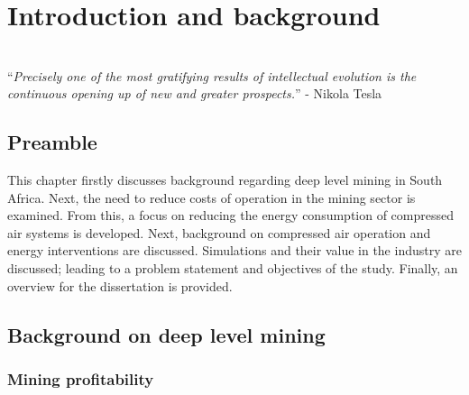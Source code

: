 \chapter{Introduction and background}  %
\thispagestyle{empty}
\vspace{38em}
\hrulefill
\\
\enquote{\textit{Precisely one of the most gratifying results of intellectual evolution is the continuous opening up of new and greater prospects.}} -  Nikola Tesla\\
\newpage

\section{Preamble}
This chapter firstly discusses background regarding deep level mining in South Africa. Next, the need to reduce costs of operation in the mining sector is examined. From this, a focus on reducing the energy consumption of compressed air systems is developed. Next, background on compressed air operation and energy interventions are discussed. Simulations and their value in the industry are discussed; leading to a problem statement and objectives of the study. Finally, an overview for the dissertation is provided.
\section{Background on deep level mining}
	\subsection{Mining profitability}
	
